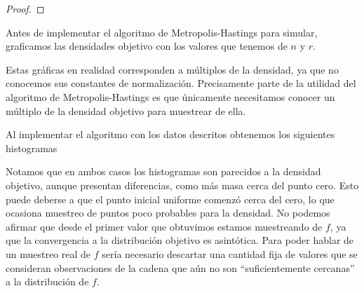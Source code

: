 \documentclass{article}
\begin{document}
\begin{enumerate}
\begin{proof}


    \end{proof}

    Antes de implementar el algoritmo de Metropolis-Hastings para simular, graficamos las densidades
    objetivo con los valores que tenemos de $n$ y $r$.

    \begin{center}
        
        
    \end{center}

    Estas gráficas en realidad corresponden a múltiplos de la densidad, ya que no conocemos sus constantes
    de normalización. Precisamente parte de la utilidad del algoritmo de Metropolis-Hastings es que únicamente
    necesitamos conocer un múltiplo de la densidad objetivo para muestrear de ella.

    Al implementar el algoritmo con los datos descritos obtenemos los siguientes histogramas

    \begin{center}
        
        
    \end{center}

    Notamos que en ambos casos los histogramas son parecidos a la densidad objetivo, aunque presentan
    diferencias, como más masa cerca del punto cero. Esto puede deberse a que el punto inicial uniforme comenzó
    cerca del cero, lo que ocasiona muestreo de puntos poco probables para la densidad. No podemos 
    afirmar que desde el primer valor que obtuvimos estamos muestreando de $f$,
    ya que la convergencia a la distribución objetivo es asintótica. Para poder hablar de un muestreo
    real de $f$ sería necesario descartar una cantidad fija de valores que se consideran observaciones
    de la cadena que aún no son ``suficientemente cercanas'' a la distribución de $f$.


\end{enumerate}
\end{document}
